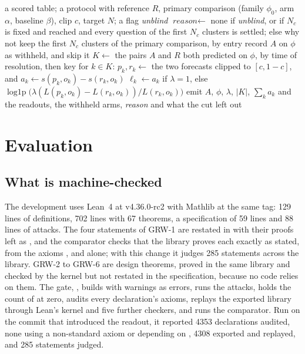 \documentclass[11pt]{article}
\theoremstyle{plain}
\theoremstyle{definition}
\theoremstyle{remark}
\begin{document}
\begin{algorithm}[t]
\caption{The growth readout of a ledger.}
\label{alg:report}
\small
\begin{algorithmic}[1]
\Require a scored table; a protocol with reference $R$, primary comparison (family $\phi_0$, arm
  $\alpha$, baseline $\beta$), clip $c$, target $N$; a flag \textit{unblind}
\State $\textit{reason}\gets$ none if \textit{unblind}, or if $N_c$ is fixed and reached and every
  question of the first $N_c$ clusters is settled; else why not
 keep the first $N_c$ clusters of the primary comparison, by entry \EndIf
{}
    record $A$ on $\phi$ as withheld, and skip it
  \EndIf
  \State $K\gets$ the pairs $A$ and $R$ both predicted on $\phi$, by time of resolution, then key
  \State for $k\in K$: $p_k,r_k\gets$ the two forecasts clipped to $[c,1-c]$, and
    $a_k\gets s(p_k,o_k)-s(r_k,o_k)$
    \State $\ell_k\gets a_k$ if $\lambda=1$, else
      $\operatorname{log1p}\bigl(\lambda(L(p_k,o_k)-L(r_k,o_k))/L(r_k,o_k)\bigr)$
    \State emit $A$, $\phi$, $\lambda$, $|K|$, $\sum_ka_k$ and 
  \EndFor
\EndFor
\State \Return the readouts, the withheld arms, \textit{reason} and what the cut left out
\end{algorithmic}
\end{algorithm}

\section{Evaluation}
\label{sec:evaluation}

\subsection{What is machine-checked}

The development uses Lean~4 at v4.36.0-rc2 with Mathlib at the same tag: 129 lines of definitions,
702 lines with 67 theorems, a specification of 59 lines and 88 lines of attacks. The four
statements of GRW-1 are restated in  with their proofs left as
, and the comparator checks that the library proves each exactly as stated, from the
axioms ,  and  alone; with this change it
judges 285 statements across the library. GRW-2 to GRW-6 are design theorems, proved in the same
library and checked by the kernel but not restated in the specification, because no code relies on
them. The gate, , builds with warnings as errors, runs the attacks, holds the
count of  at zero, audits every declaration's axioms, replays the exported library
through Lean's kernel and five further checkers, and runs the comparator. Run on the commit
that introduced the readout, it reported 4353 declarations audited, none using a non-standard
axiom or depending on , 4308 exported and replayed, and 285 statements
judged.
\end{document}
